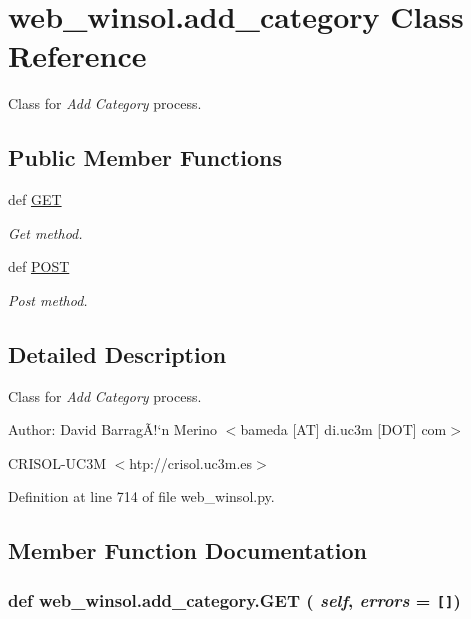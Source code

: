 \hypertarget{classweb__winsol_1_1add__category}{
\section{web\_\-winsol.add\_\-category Class Reference}
\label{classweb__winsol_1_1add__category}
}
Class for {\em Add\/} {\em Category\/} process.  


\subsection*{Public Member Functions}
\begin{CompactItemize}
\item 
def \hyperlink{classweb__winsol_1_1add__category_26d6601fa5b6e48efd2f4b784ce995df}{GET}
\begin{CompactList}\small\item\em Get method. \item\end{CompactList}\item 
def \hyperlink{classweb__winsol_1_1add__category_a23cdff93b1bf1ee3e882fa6c2d1b12e}{POST}
\begin{CompactList}\small\item\em Post method. \item\end{CompactList}\end{CompactItemize}


\subsection{Detailed Description}
Class for {\em Add\/} {\em Category\/} process. 

\begin{Desc}
\item[Author:]David Barrag\~{A}!`n Merino $<$bameda \mbox{[}AT\mbox{]} di.uc3m \mbox{[}DOT\mbox{]} com$>$ 

CRISOL-UC3M $<$htp://crisol.uc3m.es$>$ \end{Desc}




Definition at line 714 of file web\_\-winsol.py.

\subsection{Member Function Documentation}
\hypertarget{classweb__winsol_1_1add__category_26d6601fa5b6e48efd2f4b784ce995df}{
\subsubsection[GET]{\setlength{\rightskip}{0pt plus 5cm}def web\_\-winsol.add\_\-category.GET ( {\em self},  {\em errors} = {\tt \mbox{[}\mbox{]}})}}
\label{classweb__winsol_1_1add__category_26d6601fa5b6e48efd2f4b784ce995df}



